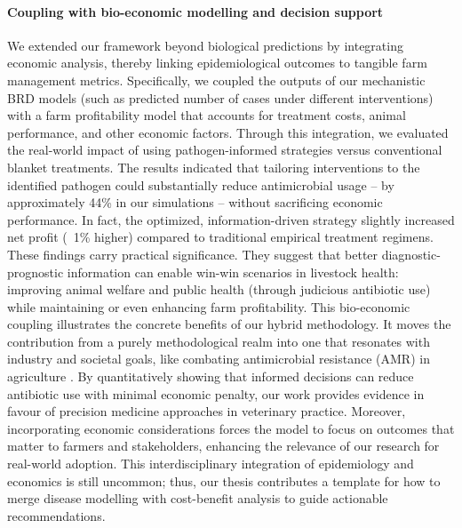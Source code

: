 \paragraph{Coupling with bio-economic modelling and decision support} We extended our framework beyond biological predictions by integrating economic analysis, thereby linking epidemiological outcomes to tangible farm management metrics. Specifically, we coupled the outputs of our mechanistic BRD models (such as predicted number of cases under different interventions) with a farm profitability model that accounts for treatment costs, animal performance, and other economic factors. Through this integration, we evaluated the real-world impact of using pathogen-informed strategies versus conventional blanket treatments. The results indicated that tailoring interventions to the identified pathogen could substantially reduce antimicrobial usage – by approximately 44\% in our simulations – without sacrificing economic performance. In fact, the optimized, information-driven strategy slightly increased net profit (~1\% higher) compared to traditional empirical treatment regimens. These findings carry practical significance. They suggest that better diagnostic-prognostic information can enable win-win scenarios in livestock health: improving animal welfare and public health (through judicious antibiotic use) while maintaining or even enhancing farm profitability. This bio-economic coupling illustrates the concrete benefits of our hybrid methodology. It moves the contribution from a purely methodological realm into one that resonates with industry and societal goals, like combating antimicrobial resistance (AMR) in agriculture \cite{lhermie2019antibiotic}. By quantitatively showing that informed decisions can reduce antibiotic use with minimal economic penalty, our work provides evidence in favour of precision medicine approaches in veterinary practice. Moreover, incorporating economic considerations forces the model to focus on outcomes that matter to farmers and stakeholders, enhancing the relevance of our research for real-world adoption. This interdisciplinary integration of epidemiology and economics is still uncommon; thus, our thesis contributes a template for how to merge disease modelling with cost-benefit analysis to guide actionable recommendations.

